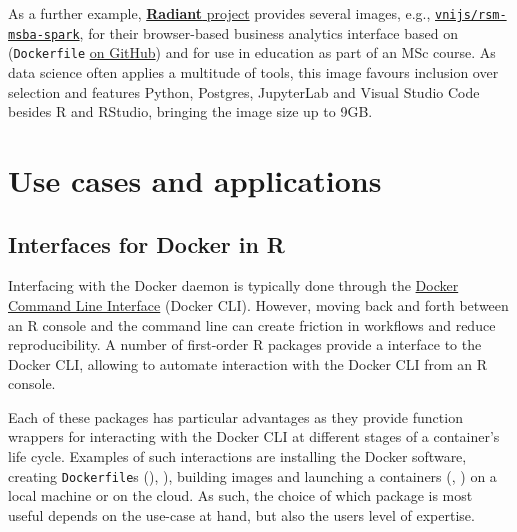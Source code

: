 As a further example,
\href{https://radiant-rstats.github.io/docs/}{\textbf{Radiant} project}
provides several images, e.g.,
\href{https://hub.docker.com/r/vnijs/rsm-msba-spark}{\texttt{vnijs/rsm-msba-spark}},
for their browser-based business analytics interface based on
 (\texttt{Dockerfile}
\href{https://github.com/radiant-rstats/docker}{on GitHub}) and for use
in education as part of an MSc course. As data science often applies a
multitude of tools, this image favours inclusion over selection and
features Python, Postgres, JupyterLab and Visual Studio Code besides R
and RStudio, bringing the image size up to 9GB.

\hypertarget{use-cases-and-applications}{%
\section{Use cases and applications}\label{use-cases-and-applications}}

\hypertarget{interfaces-for-docker-in-r}{%
\subsection{Interfaces for Docker in
R}\label{interfaces-for-docker-in-r}}

\label{interfaces}

Interfacing with the Docker daemon is typically done through the
\href{https://docs.docker.com/engine/reference/commandline/cli/}{Docker
Command Line Interface} (Docker CLI). However, moving back and forth
between an R console and the command line can create friction in
workflows and reduce reproducibility. A number of first-order R packages
provide a interface to the Docker CLI, allowing to automate interaction
with the Docker CLI from an R console.

Each of these packages has particular advantages as they provide
function wrappers for interacting with the Docker CLI at different
stages of a container's life cycle. Examples of such interactions are
installing the Docker software, creating \texttt{Dockerfile}s
(), ), building images and launching a
containers (, ) on a local machine or on the
cloud. As such, the choice of which package is most useful depends on
the use-case at hand, but also the users level of expertise.

